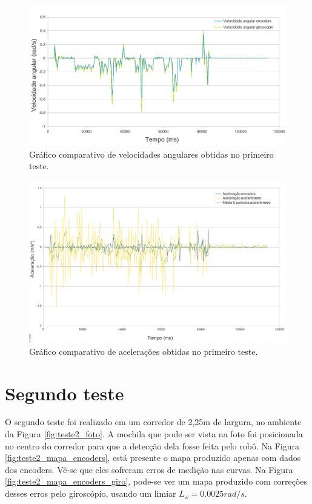 \begin{figure}[H]
	\centering
	\includegraphics[width=1\textwidth]{./figuras/testes/teste1/grafico_giro.png}
	\caption{Gráfico comparativo de velocidades angulares obtidas no primeiro teste.}
	\label{fig:teste1_giro_grafico}
\end{figure}

\begin{figure}[H]
	\centering
	\includegraphics[width=1\textwidth]{./figuras/testes/teste1/grafico_acel.png}
	\caption{Gráfico comparativo de acelerações obtidas no primeiro teste.}
	\label{fig:teste1_acel_grafico}
\end{figure}



\section{Segundo teste}

O segundo teste foi realizado em um corredor de 2,25m de largura, no ambiente da Figura \ref{fig:teste2_foto}. A mochila que pode ser vista na foto foi posicionada no centro do corredor para que a detecção dela fosse feita pelo robô. Na Figura \ref{fig:teste2_mapa_encoders}, está presente o mapa produzido apenas com dados dos encoders. Vê-se que eles sofreram erros de medição nas curvas. Na Figura \ref{fig:teste2_mapa_encoders_giro}, pode-se ver um mapa produzido com correções desses erros pelo giroscópio, usando um limiar $L_\omega = 0.0025 \unit{rad/s}$. 

